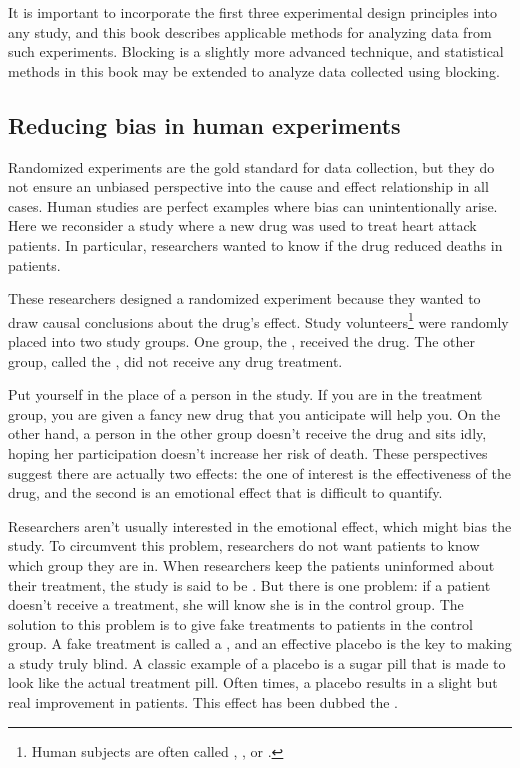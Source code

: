 It is important to incorporate the first three experimental
design principles into any study, and this book describes
applicable methods for analyzing data from such experiments.
Blocking is a slightly more advanced technique, and statistical
methods in this book may be extended to analyze data collected
using blocking.

\subsection{Reducing bias in human experiments}
\label{biasInHumanExperiments}

Randomized experiments are the gold standard for data collection,
but they do not ensure an unbiased perspective into the cause and
effect relationship in all cases.
Human studies are perfect examples where bias can unintentionally
arise.
Here we reconsider a study where a new drug was used to treat
heart attack patients.
In particular, researchers wanted to know if the drug reduced
deaths in patients.

These researchers designed a randomized experiment because they wanted to draw causal conclusions about the drug's effect. Study volunteers\footnote{Human subjects are often called , , or .} were randomly placed into two study groups. One group, the , received the drug. The other group, called the , did not receive any drug treatment.

Put yourself in the place of a person in the study. If you are in the treatment group, you are given a fancy new drug that you anticipate will help you. On the other hand, a person in the other group doesn't receive the drug and sits idly, hoping her participation doesn't increase her risk of death. These perspectives suggest there are actually two effects: the one of interest is the effectiveness of the drug, and the second is an emotional effect that is difficult to quantify.

Researchers aren't usually interested in the emotional effect,
which might bias the study.
To circumvent this problem, researchers do not want patients
to know which group they are in.
When researchers keep the patients uninformed about their
treatment, the study is said to be .
But there is one problem:
if a patient doesn't receive a treatment, she will know she
is in the control group.
The solution to this problem is to give fake treatments to
patients in the control group.
A fake treatment is called a , and an effective
placebo is the key to making a study truly blind.
A classic example of a placebo is a sugar pill that is made
to look like the actual treatment pill.
Often times, a placebo results in a slight but real
improvement in patients.
This effect has been dubbed the .

